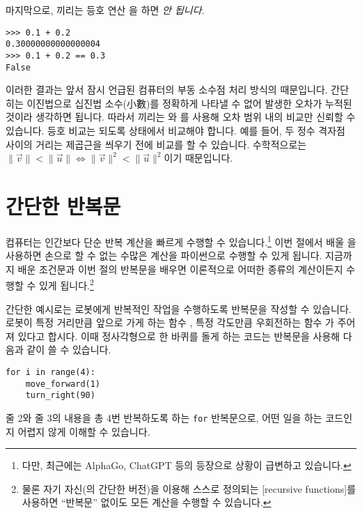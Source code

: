 \documentclass[../main.tex]{subfiles}
\begin{document}
마지막으로, 끼리는 등호 연산 \pyin{==}을 하면 \emph{안 됩니다.}
\begin{verbatim}
>>> 0.1 + 0.2
0.30000000000000004
>>> 0.1 + 0.2 == 0.3
False
\end{verbatim}
이러한 결과는 앞서 잠시 언급된 컴퓨터의 부동 소수점 처리 방식의  때문입니다.
간단히는 이진법으로 십진법 소수(小數)를 정확하게 나타낼 수 없어 발생한 오차가 누적된 것이라 생각하면 됩니다.
따라서 끼리는 \pyin{>}와 \pyin{<}를 사용해 오차 범위 내의 비교만 신뢰할 수 있습니다.
등호 비교는 되도록  상태에서 비교해야 합니다.
예를 들어, 두 정수 격자점 사이의 거리는 제곱근을 씌우기 전에 비교를 할 수 있습니다.
수학적으로는 $\lVert \vec v \rVert < \lVert \vec u \rVert \Leftrightarrow \lVert \vec v \rVert^2 < \lVert \vec u \rVert^2$이기 때문입니다.

\section{간단한 반복문}
컴퓨터는 인간보다 단순 반복 계산을 빠르게 수행할 수 있습니다.\footnote{다만, 최근에는 AlphaGo, ChatGPT 등의 등장으로 상황이 급변하고 있습니다.}
이번 절에서 배울 을 사용하면 손으로 할 수 없는 수많은 계산을 파이썬으로 수행할 수 있게 됩니다.
지금까지 배운 조건문과 이번 절의 반복문을 배우면 이론적으로 어떠한 종류의 계산이든지 수행할 수 있게 됩니다.\footnote{물론 자기 자신(의 간단한 버전)을 이용해 스스로 정의되는 [recursive functions]를 사용하면 ``반복문'' 없이도 모든 계산을 수행할 수 있습니다.}

간단한 예시로는 로봇에게 반복적인 작업을 수행하도록 반복문을 작성할 수 있습니다.
로봇이 특정 거리만큼 앞으로 가게 하는 함수 , 특정
각도만큼 우회전하는 함수 가 주어져 있다고 합시다.
이때 정사각형으로 한 바퀴를 돌게 하는 코드는 반복문을 사용해 다음과
같이 쓸 수 있습니다.
\begin{verbatim}
for i in range(4):
    move_forward(1)
    turn_right(90)
\end{verbatim}
줄 2와 줄 3의 내용을 총 4번 반복하도록 하는 \verb|for| 반복문으로, 어떤 일을
하는 코드인지 어렵지 않게 이해할 수 있습니다.
\end{document}
